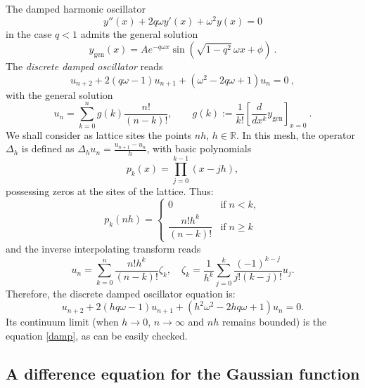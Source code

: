 \documentclass[10pt]{amsart}
\numberwithin{equation}{section}
\theoremstyle{definition}
\begin{document}
The damped harmonic oscillator
\begin{equation}
\label{damp}
y''(x)+2 q \omega y'(x)+\omega ^{2} y(x)=0
\end{equation}
in the case $q< 1$ admits the general solution
\begin{equation}
y_{\mathrm{gen}}(x)=A e^{-q \omega x}\sin \left ( \sqrt{1-q^{2}} \,
\omega x+ \phi \right ) \ .
\label{eq10.2}
\end{equation}
The \textit{discrete damped oscillator} reads
\begin{equation}
u_{n+2} +2(q \omega -1) u_{n+1} +(\omega ^{2}-2q\omega +1)u_{n} = 0
\ ,
\label{eq10.3}
\end{equation}
with the general solution
\begin{equation}
u_{n}=\sum _{k=0}^{n}g(k)\frac{n!}{(n-k)!},
\qquad
g(k):=\frac{1}{k!}\left [\frac{d}{dx^{k}} y_{\mathrm{gen}}\right ]_{x=0}
\ .
\label{eq10.4}
\end{equation}
We shall consider as lattice sites the points $nh$,
$h\in \mathbb{R}$. In this mesh, the operator $\Delta _{h}$ is defined
as $\Delta _{h} u_{n}=\frac{u_{n+1}-u_{n}}{h}$, with basic polynomials
\begin{equation}
\label{eq:10.5}
p_{k}(x)=\prod _{j=0}^{k-1}(x-jh),
\end{equation}
possessing zeros at the sites of the lattice. Thus:
\begin{equation}
p_{k}(nh)=
\begin{cases}
0 & \mathrm{if}\; n<k,
\\
\dfrac{n!h^{k}}{(n-k)!} & \mathrm{if}\; n \geq k
\label{pol2}
\end{cases}
\end{equation}
and the inverse interpolating transform reads
\begin{equation}
\label{eq:6.29}
u_{n}= \sum _{k=0}^{n} \frac{n!h^{k}}{(n-k)!} \zeta _{k},\quad \zeta _{k}=
\frac{1}{h^{k}}\sum _{j=0}^{k} \frac{(-1)^{k-j}}{j!(k-j)!}u_{j}.
\end{equation}
Therefore, the discrete damped oscillator equation is:
\begin{equation}
u_{n+2} +2(h q \omega -1) u_{n+1} +(h^{2}\omega ^{2}-2 h q\omega +1)u_{n}
= 0.
\label{eq10.8}
\end{equation}
Its continuum limit (when $h\to 0$, $n\to \infty $ and $nh$ remains bounded)
is the equation  \eqref{damp}, as can be easily checked.

\subsection{A difference equation for the Gaussian function}
\label{sec10.2}
\end{document}
